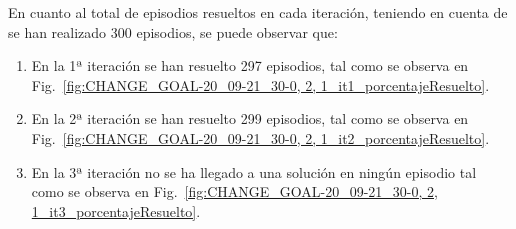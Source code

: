En cuanto al total de episodios resueltos en cada iteración, teniendo en cuenta de se han realizado 300 episodios, se puede observar que: 
\begin{enumerate}
    \item En la 1ª iteración se han resuelto 297 episodios, tal como se observa en Fig.~\ref{fig:CHANGE_GOAL-20_09-21_30-0, 2, 1_it1_porcentajeResuelto}.
    \item En la 2ª iteración se han resuelto 299 episodios, tal como se observa en Fig.~\ref{fig:CHANGE_GOAL-20_09-21_30-0, 2, 1_it2_porcentajeResuelto}.
    \item En la 3ª iteración no se ha llegado a una solución en ningún episodio tal como se observa en Fig.~\ref{fig:CHANGE_GOAL-20_09-21_30-0, 2, 1_it3_porcentajeResuelto}.
\end{enumerate}

